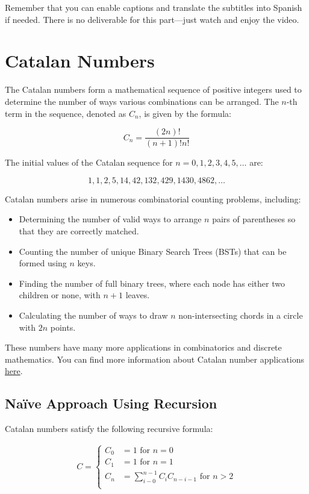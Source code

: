 \documentclass[12pt]{article}
\begin{document}
Remember that you can enable captions and translate the subtitles into Spanish if needed. There is no deliverable for this part—just watch and enjoy the video.

\section{Catalan Numbers}
The Catalan numbers form a mathematical sequence of positive integers used to determine the number of ways various combinations can be arranged. The $n$-th term in the sequence, denoted as $C_n$, is given by the formula:

\[
C_n = \frac{(2n)!}{(n+1)!n!}
\]

The initial values of the Catalan sequence for $n = 0, 1, 2, 3, 4, 5, \dots$ are:

\[
1, 1, 2, 5, 14, 42, 132, 429, 1430, 4862, \dots
\]

Catalan numbers arise in numerous combinatorial counting problems, including:

\begin{itemize}
    \item Determining the number of valid ways to arrange $n$ pairs of parentheses so that they are correctly matched.
    \item Counting the number of unique Binary Search Trees (BSTs) that can be formed using $n$ keys.
    \item Finding the number of full binary trees, where each node has either two children or none, with $n+1$ leaves.
    \item Calculating the number of ways to draw $n$ non-intersecting chords in a circle with $2n$ points.
\end{itemize}

These numbers have many more applications in combinatorics and discrete mathematics. You can find more information about Catalan number applications \href{https://www.geeksforgeeks.org/applications-of-catalan-numbers/}{here}.

\subsection{Naïve Approach Using Recursion}

Catalan numbers satisfy the following recursive formula:

\begin{equation*}
    \begin{align}
    C =
        \begin{cases}
            C_0 &= 1 \text{ for } n = 0 \\
            C_1 &= 1 \text{ for } n = 1 \\
            C_n &= \sum_{i - 0}^{n - 1}C_i C_{n - i - 1} \text{ for } n > 2 \\
        \end{cases}
    \end{align}
\end{equation*}
\end{document}
